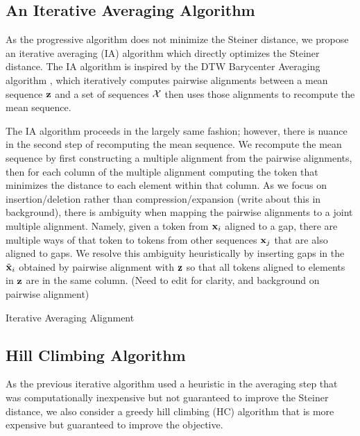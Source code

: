 \documentclass{article}
\begin{document}
\subsection{An Iterative Averaging Algorithm}
As the progressive algorithm does not minimize the Steiner distance,
we propose an iterative averaging (IA) algorithm which directly optimizes the Steiner distance.
The IA algorithm is inspired by the
DTW Barycenter Averaging algorithm \citep{petitjean2011dba},
which iteratively computes pairwise alignments between a mean sequence $\mathbf{z}$
and a set of sequences $\mathcal{X}$ then uses those alignments to recompute the mean sequence. 

The IA algorithm proceeds in the largely same fashion;
however, there is nuance in the second step of recomputing the mean sequence.
We recompute the mean sequence by first constructing a multiple alignment from the
pairwise alignments, then for each column of the multiple alignment
computing the token that minimizes the distance to each element within that column.
As we focus on insertion/deletion rather than compression/expansion
(write about this in background),
there is ambiguity when mapping the pairwise alignments to a joint multiple alignment.
Namely, given a token from $\mathbf{x}_i$ aligned to a gap,
there are multiple ways of that token to tokens from other
sequences $\mathbf{x}_j$ that are also aligned to gaps.
We resolve this ambiguity heuristically by inserting gaps in
the $\tilde{\mathbf{x}}_i$ obtained by pairwise alignment with $\mathbf{z}$
so that all tokens aligned to elements in $\mathbf{z}$ are in the same column.
(Need to edit for clarity, and background on pairwise alignment)

\begin{algorithm}[h]
\begin{algorithmic}
    \EndFor
\EndFor
{}
\end{algorithmic}
\caption{\label{alg:iterative}
Iterative Averaging Alignment
}
\end{algorithm}

\subsection{Hill Climbing Algorithm}
As the previous iterative algorithm used a heuristic in the averaging step
that was computationally inexpensive but not guaranteed to improve the Steiner distance,
we also consider a greedy hill climbing (HC) algorithm that is more expensive but
guaranteed to improve the objective.
\end{document}

